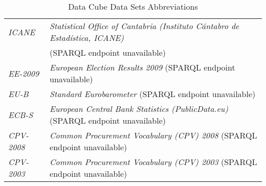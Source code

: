 \documentclass{llncs}
\begin{document}
\begin{table}[H]
\begin{tabular}{l|l}
		\emph{ICANE} & \emph{Statistical Office of Cantabria (Instituto Cántabro de Estadística, ICANE)} \\ 
		      & (SPARQL endpoint unavailable) \\
		\emph{EE-2009} & \emph{European Election Results 2009} (SPARQL endpoint unavailable) \\
		\emph{EU-B} & \emph{Standard Eurobarometer} (SPARQL endpoint unavailable) \\
		\emph{ECB-S} & \emph{European Central Bank Statistics (PublicData.eu)} (SPARQL endpoint unavailable) \\
		\emph{CPV-2008} & \emph{Common Procurement Vocabulary (CPV) 2008} (SPARQL endpoint unavailable) \\
		\emph{CPV-2003} & \emph{Common Procurement Vocabulary (CPV) 2003} (SPARQL endpoint unavailable) \\
		\end{tabular}
	\caption{Data Cube Data Sets Abbreviations}
	\label{tab:data-cube-data-sets-abbreviations}
\end{table}
\end{document}
